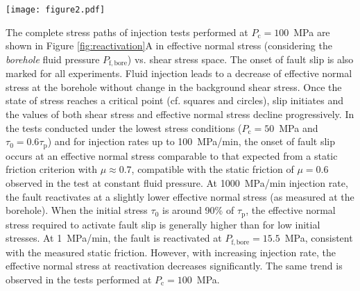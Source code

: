 \documentclass[grl]{agutex2arxiv}
\begin{document}
\begin{article}
\begin{figure*}
\begin{center}
  \texttt{[image: figure2.pdf]}
\end{center}
\caption{Static reactivation of the experimental fault. (A) Mohr diagram presenting the fault reactivation conditions in all experiments. Solid lines correspond to the tracks of the stresses obtained during the experiment conducted at 100 MPa confining pressure and initial stress equal to 90\% of $\tau_\mathrm{p}$. Dashed lines correspond to frictional strength using friction coefficients of 0.6 and 1. Symbols correspond to the state of stress at the onset of slip for each experiments and conditions tested. Red stars: onset of slip under constant pressure conditions. Squares: onset of slip during injection at an initial stress equal to 60\% of $\tau_\mathrm{p}$. Circles: onset of slip during injection at an initial stress equal to 90\% of $\tau_\mathrm{p}$. (B) Fluid pressure allowing fault reactivation as a function of the injection rate. The dashed line corresponds to the background level of the fluid pressure in our experiments.}
\label{fig:reactivation}
\end{figure*}

The complete stress paths of injection tests performed at $P_\mathrm{c}=100$~MPa are shown in Figure \ref{fig:reactivation}A in effective normal stress (considering the \emph{borehole} fluid pressure $P_\mathrm{f,bore}$) vs. shear stress space. The onset of fault slip is also marked for all experiments. Fluid injection leads to a decrease of effective normal stress at the borehole without change in the background shear stress. Once the state of stress reaches a critical point (cf. squares and circles), slip initiates and the values of both shear stress and effective normal stress decline progressively. In the tests conducted under the lowest stress conditions ($P_\mathrm{c}=50$~MPa and $\tau_0=0.6\tau_\mathrm{p}$) and for injection rates up to 100~MPa/min, the onset of fault slip occurs at an effective normal stress comparable to that expected from a static friction criterion with $\mu\approx0.7$, compatible with the static friction of $\mu=0.6$ observed in the test at constant fluid pressure. At 1000~MPa/min injection rate, the fault reactivates at a slightly lower effective normal stress (as measured at the borehole). When the initial stress $\tau_0$ is around 90\% of $\tau_\mathrm{p}$, the effective normal stress required to activate fault slip is generally higher than for low initial stresses. At 1~MPa/min, the fault is reactivated at $P_\mathrm{f,bore}=15.5$~MPa, consistent with the measured static friction. However, with increasing injection rate, the effective normal stress at reactivation decreases significantly. The same trend is observed in the tests performed at $P_\mathrm{c}=100$~MPa.


\end{article}
\end{document}
